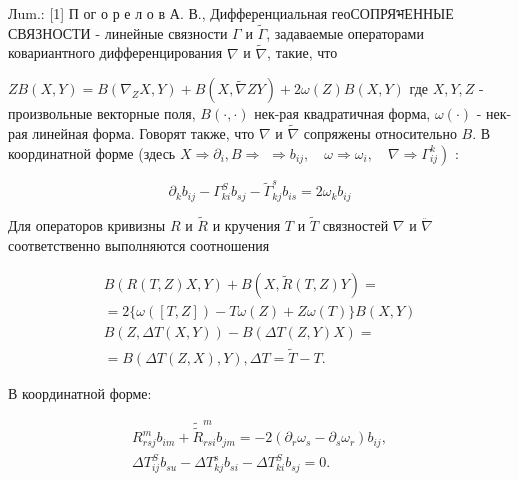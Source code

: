 \documentclass[10pt]{article}
\begin{document}
Лum.: [1] П ог о р е л о в А. В., Дифференциальная геоСОПРЯभЕННЫЕ СВЯЗНОСТИ - линейные связности $\Gamma$ и $\tilde{\Gamma}$, задаваемые операторами ковариантного дифференцирования $\nabla$ и $\tilde{\nabla}$, такие, что



$Z B(X, Y)=B\left(\nabla_{Z} X, Y\right)+B(X, \tilde{\nabla} Z Y)+2 \omega(Z) B(X, Y)$ где $X, Y, Z$ - произвольные векторные поля, $B(\cdot, \cdot)$ нек-рая квадратичная форма, $\omega(\cdot)$ - нек-рая линейная форма. Говорят также, что $\nabla$ и $\tilde{\nabla}$ сопряжены относительно $B$. В координатной форме (здесь $X \Rightarrow \partial_{i}, B \Rightarrow$ $\left.\Rightarrow b_{i j}, \quad \omega \Rightarrow \omega_{i}, \quad \nabla \Rightarrow \Gamma_{i j}^{k}\right)$ :



\[

\partial_{k} b_{i j}-\Gamma_{k i}^{S} b_{s j}-\tilde{\Gamma}_{k j}^{s} b_{i s}=2 \omega_{k} b_{i j}

\]



Для операторов кривизны $R$ и $\tilde{R}$ и кручения $T$ и $\tilde{T}$ связностей $\nabla$ и $\ddot{\nabla}$ соответственно выполняются соотношения



\[

\begin{gathered}

B(R(T, Z) X, Y)+B(X, \tilde{R}(T, Z) Y)= \\

=2\{\omega([T, Z])-T \omega(Z)+Z \omega(T)\} B(X, Y) \\

B(Z, \Delta T(X, Y))-B(\Delta T(Z, Y) X)= \\

=B(\Delta T(Z, X), Y), \Delta T=\tilde{T}-T .

\end{gathered}

\]



В координатной форме:



\[

\begin{gathered}

R_{r s j}^{m} b_{i m}+\tilde{\tilde{R}}_{r s i}^{m} b_{j m}=-2\left(\partial_{r} \omega_{s}-\partial_{s} \omega_{r}\right) b_{i j}, \\

\Delta T_{i j}^{S} b_{s u}-\Delta T_{k j}^{\mathrm{s}} b_{s i}-\Delta T_{k i}^{S} b_{s j}=0 .

\end{gathered}

\]
\end{document}
